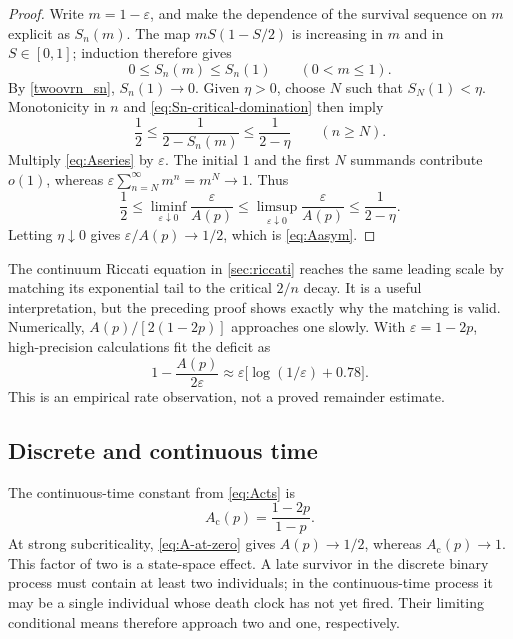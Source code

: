 \begin{proof}
Write \(m=1-\varepsilon\), and make the dependence of the survival sequence on
\(m\) explicit as \(S_n(m)\).  The map
\(mS(1-S/2)\) is increasing in \(m\) and in \(S\in[0,1]\); induction therefore
gives
\begin{equation}
  0\leq S_n(m)\leq S_n(1)
  \qquad (0<m\leq1).
  \label{eq:Sn-critical-domination}
\end{equation}
By \eqref{twoovrn_sn}, \(S_n(1)\to0\).  Given \(\eta>0\), choose \(N\) such
that \(S_N(1)<\eta\).  Monotonicity in \(n\) and
\eqref{eq:Sn-critical-domination} then imply
\[
  \frac12
  \leq\frac{1}{2-S_n(m)}
  \leq\frac{1}{2-\eta}
  \qquad(n\geq N).
\]
Multiply \eqref{eq:Aseries} by \(\varepsilon\).  The initial \(1\) and the first
\(N\) summands contribute \(o(1)\), whereas
\(
  \varepsilon\sum_{n=N}^{\infty}m^n=m^N\to1.
\)
Thus
\[
  \frac12
  \leq\liminf_{\varepsilon\downarrow0}\frac{\varepsilon}{A(p)}
  \leq\limsup_{\varepsilon\downarrow0}\frac{\varepsilon}{A(p)}
  \leq\frac{1}{2-\eta}.
\]
Letting \(\eta\downarrow0\) gives
\(
  \varepsilon/A(p)\to1/2
\), which is \eqref{eq:Aasym}.
\end{proof}

The continuum Riccati equation in \cref{sec:riccati} reaches the same leading
scale by matching its exponential tail to the critical \(2/n\) decay.  It is a
useful interpretation, but the preceding proof shows exactly why the matching is
valid.  Numerically, \(A(p)/[2(1-2p)]\) approaches one slowly.  With
\(\varepsilon=1-2p\), high-precision calculations fit the deficit as
\begin{equation}
  1-\frac{A(p)}{2\varepsilon}
  \approx \varepsilon\bigl[\log(1/\varepsilon)+0.78\bigr].
  \label{eq:A-empirical-remainder}
\end{equation}
This is an empirical rate observation, not a proved remainder estimate.

\subsection{Discrete and continuous time}
\label{sec:compare}

The continuous-time constant from \eqref{eq:Acts} is
\[
  A_{\mathrm c}(p)=\frac{1-2p}{1-p}.
\]
At strong subcriticality, \eqref{eq:A-at-zero} gives
\(A(p)\to1/2\), whereas \(A_{\mathrm c}(p)\to1\).  This factor of two is a
state-space effect.  A late survivor in the discrete binary process must contain
at least two individuals; in the continuous-time process it may be a single
individual whose death clock has not yet fired.  Their limiting conditional means
therefore approach two and one, respectively.

